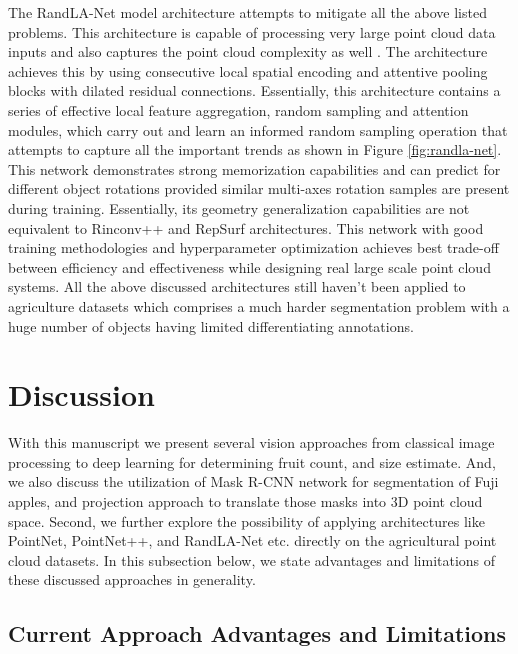 \documentclass{article}
\begin{document}
The RandLA-Net model architecture attempts to mitigate all the above listed problems.
This architecture is capable of processing very large point cloud data inputs and also captures the point cloud complexity as well \cite{hu2020randla}.
The architecture achieves this by using consecutive local spatial encoding and attentive pooling blocks with dilated residual connections.
Essentially, this architecture contains a series of effective local feature aggregation, random sampling and attention modules, which carry out and learn an informed random sampling operation that attempts to capture all the important trends as shown in Figure \ref{fig:randla-net}.
This network demonstrates strong memorization capabilities and can predict for different object rotations provided similar multi-axes rotation samples are present during training.
Essentially, its geometry generalization capabilities are not equivalent to Rinconv++ and RepSurf architectures.
This network with good training methodologies and hyperparameter optimization achieves best trade-off between efficiency and effectiveness while designing real large scale point cloud systems.
All the above discussed architectures still haven’t been applied to agriculture datasets which comprises a much harder segmentation problem with a huge number of objects having limited differentiating annotations.


\section{Discussion}


With this manuscript we present several vision approaches from classical image processing to deep learning for determining fruit count, and size estimate. 
And, we also discuss the utilization of Mask R-CNN network for segmentation of Fuji apples, and projection approach to translate those masks into 3D point cloud space.
Second, we further explore the possibility of applying architectures like PointNet, PointNet++, and RandLA-Net etc. directly on the agricultural point cloud datasets.
In this subsection below, we state advantages and limitations of these discussed approaches in generality.


\subsection{Current Approach Advantages and Limitations}
\end{document}
